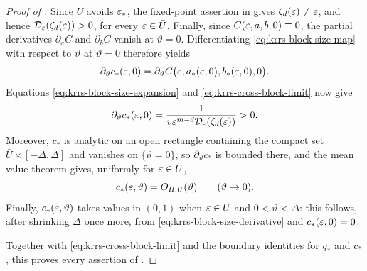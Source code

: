 \begin{proof}[Proof of ]
Since \(\bar U\) avoids \(\varepsilon_*\), the fixed-point assertion in
 gives
\(\zeta_d(\varepsilon)\ne\varepsilon\), and hence
\(\mathcal D_\varepsilon(\zeta_d(\varepsilon))>0\), for every \(\varepsilon\in\bar U\).
Finally, since \(C(\varepsilon,a,b,0)\equiv0\), the partial derivatives
\(\partial_aC\) and \(\partial_bC\) vanish at \(\vartheta=0\).
Differentiating \eqref{eq:krrs-block-size-map} with respect to \(\vartheta\) at
\(\vartheta=0\) therefore yields
\[
  \partial_\vartheta c_*(\varepsilon,0)
  =\partial_\vartheta C\bigl(
     \varepsilon,a_*(\varepsilon,0),b_*(\varepsilon,0),0\bigr).
\]
Equations \eqref{eq:krrs-block-size-expansion} and \eqref{eq:krrs-cross-block-limit} now give
\begin{equation}\label{eq:krrs-block-size-derivative}
  \partial_\vartheta c_*(\varepsilon,0)
  =\frac{1}{v\varepsilon^{m-d}
       \mathcal D_\varepsilon(\zeta_d(\varepsilon))}>0.
\end{equation}
Moreover, \(c_*\) is analytic on an open rectangle containing the compact
set \(\bar U\times[-\Delta,\Delta]\) and vanishes on
\(\{\vartheta=0\}\), so \(\partial_\vartheta c_*\) is bounded there, and
the mean value theorem gives, uniformly for \(\varepsilon\in U\),
\[
  c_*(\varepsilon,\vartheta)=O_{H,U}(\vartheta)
  \qquad(\vartheta\to0).
\]
Finally, \(c_*(\varepsilon,\vartheta)\) takes values in \((0,1)\) when
\(\varepsilon\in U\) and \(0<\vartheta<\Delta\): this follows, after shrinking
\(\Delta\) once more, from \eqref{eq:krrs-block-size-derivative} and
\(c_*(\varepsilon,0)=0\).

Together with \eqref{eq:krrs-cross-block-limit} and the boundary identities for
\(q_*\) and \(c_*\), this proves every assertion of
.
\end{proof}
